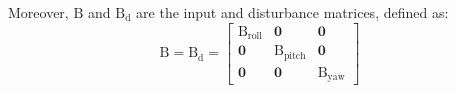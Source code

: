 \documentclass[3p,times]{elsarticle}
\begin{document}
Moreover, $\boldsymbol{\mathrm{B}}$ and $\boldsymbol{\mathrm{B_d}}$ are the input and disturbance matrices, defined as:
\begin{equation}
	\boldsymbol{\mathrm{B}} = \boldsymbol{\mathrm{B_d}} = 
	\begin{bmatrix}
		\boldsymbol{{\mathrm{B_{\text{roll}}}}} & \boldsymbol{0} & \boldsymbol{0}\\
		\boldsymbol{0} & \boldsymbol{{\mathrm{B_{\text{pitch}}}}} & \boldsymbol{0} \\
		\boldsymbol{0} & \boldsymbol{0} & \boldsymbol{{\mathrm{B_{\text{yaw}}}}}
	\end{bmatrix}
\end{equation}

\end{document}

